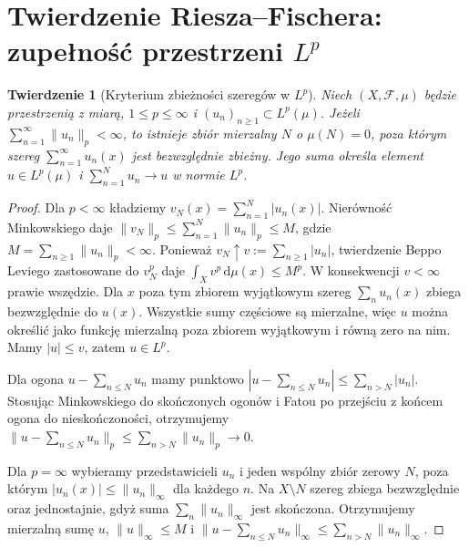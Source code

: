 \documentclass[11pt,a4paper,oneside]{book}
\numberwithin{equation}{chapter}
\theoremstyle{plain}
\newtheorem{twierdzenie}{Twierdzenie}[chapter]
\theoremstyle{definition}
\theoremstyle{remark}
\begin{document}
\section{Twierdzenie Riesza--Fischera: zupełność przestrzeni $L^p$}

\begin{twierdzenie}[Kryterium zbieżności szeregów w $L^p$]
\label{thm:series-lp-14}
Niech $(X,\mathcal F,\mu)$ będzie przestrzenią z miarą,
$1\le p\le\infty$ i $(u_n)_{n\ge1}\subset L^p(\mu)$.
Jeżeli $\sum_{n=1}^\infty\|u_n\|_p<\infty$,
to istnieje zbiór mierzalny $N$ o $\mu(N)=0$,
poza którym szereg $\sum_{n=1}^\infty u_n(x)$
jest bezwzględnie zbieżny. Jego suma określa element $u\in L^p(\mu)$
i $\sum_{n=1}^N u_n\to u$ w normie $L^p$.
\end{twierdzenie}
\begin{proof}
Dla $p<\infty$ kładziemy $v_N(x)=\sum_{n=1}^N|u_n(x)|$.
Nierówność Minkowskiego daje
$\|v_N\|_p\le\sum_{n=1}^N\|u_n\|_p\le M$,
gdzie $M=\sum_{n\ge1}\|u_n\|_p<\infty$.
Ponieważ $v_N\uparrow v:=\sum_{n\ge1}|u_n|$,
twierdzenie Beppo Leviego zastosowane do $v_N^p$ daje
$\int_Xv^p\,\mathrm d\mu(x)\le M^p$.
W konsekwencji $v<\infty$ prawie wszędzie.
Dla $x$ poza tym zbiorem wyjątkowym szereg
$\sum_nu_n(x)$ zbiega bezwzględnie do $u(x)$.
Wszystkie sumy częściowe są mierzalne, więc $u$
można określić jako funkcję mierzalną poza zbiorem
wyjątkowym i równą zero na nim. Mamy $|u|\le v$,
zatem $u\in L^p$.

Dla ogona $u-\sum_{n\le N}u_n$ mamy punktowo
$|u-\sum_{n\le N}u_n|\le\sum_{n>N}|u_n|$.
Stosując Minkowskiego do skończonych ogonów
i Fatou po przejściu z końcem ogona do nieskończoności,
otrzymujemy
$\|u-\sum_{n\le N}u_n\|_p\le\sum_{n>N}\|u_n\|_p\to0$.

Dla $p=\infty$ wybieramy przedstawicieli $u_n$
i jeden wspólny zbiór zerowy $N$, poza którym
$|u_n(x)|\le\|u_n\|_\infty$ dla każdego $n$.
Na $X\setminus N$ szereg zbiega bezwzględnie
oraz jednostajnie, gdyż suma $\sum_n\|u_n\|_\infty$
jest skończona. Otrzymujemy mierzalną sumę $u$,
$\|u\|_\infty\le M$ i
$\|u-\sum_{n\le N}u_n\|_\infty\le\sum_{n>N}\|u_n\|_\infty$.
\end{proof}
\end{document}
